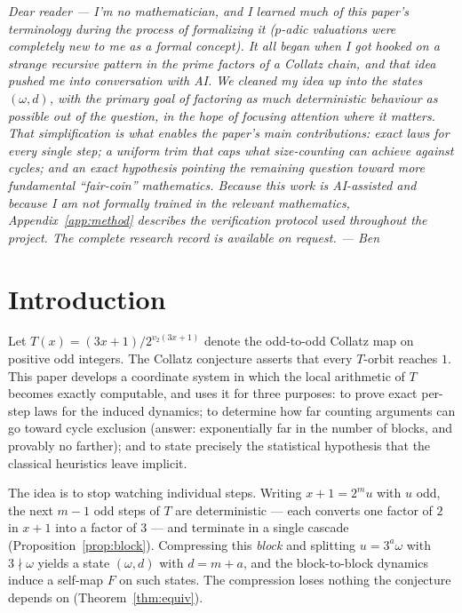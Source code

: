 \documentclass[11pt]{article}
\theoremstyle{remark}
\newcommand{\vt}[1]{v_2\!\left(#1\right)}
\newcommand{\w}{\omega}
\begin{document}
\emph{Dear reader --- I'm no mathematician, and I learned much of this paper's terminology during the process of formalizing it ($p$-adic valuations were completely new to me as a formal concept). It all began when I got hooked on a strange recursive pattern in the prime factors of a Collatz chain, and that idea pushed me into conversation with AI. We cleaned my idea up into the states $(\w,d)$, with the primary goal of factoring as much deterministic behaviour as possible out of the question, in the hope of focusing attention where it matters. That simplification is what enables the paper's main contributions: exact laws for every single step; a uniform trim that caps what size-counting can achieve against cycles; and an exact hypothesis pointing the remaining question toward more fundamental ``fair-coin'' mathematics. Because this work is AI-assisted and because I am not formally trained in the relevant mathematics, Appendix~\ref{app:method} describes the verification protocol used throughout the project. The complete research record is available on request. --- Ben}

\section{Introduction}

Let $T(x) = (3x+1)/2^{\vt{3x+1}}$ denote the odd-to-odd Collatz map on positive odd integers. The Collatz conjecture asserts that every $T$-orbit reaches $1$. This paper develops a coordinate system in which the local arithmetic of $T$ becomes exactly computable, and uses it for three purposes: to prove exact per-step laws for the induced dynamics; to determine how far counting arguments can go toward cycle exclusion (answer: exponentially far in the number of blocks, and provably no farther); and to state precisely the statistical hypothesis that the classical heuristics leave implicit.

The idea is to stop watching individual steps. Writing $x + 1 = 2^m u$ with $u$ odd, the next $m-1$ odd steps of $T$ are deterministic --- each converts one factor of $2$ in $x+1$ into a factor of $3$ --- and terminate in a single cascade (Proposition~\ref{prop:block}). Compressing this \emph{block} and splitting $u = 3^a\w$ with $3\nmid\w$ yields a state $(\w, d)$ with $d = m + a$, and the block-to-block dynamics induce a self-map $F$ on such states. The compression loses nothing the conjecture depends on (Theorem~\ref{thm:equiv}).
\end{document}
